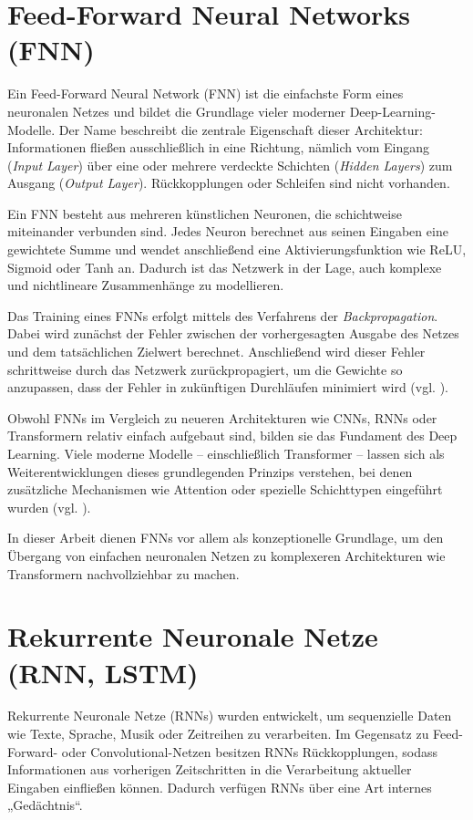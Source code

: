 \section{Feed-Forward Neural Networks (FNN)}

Ein Feed-Forward Neural Network (FNN) ist die einfachste Form eines neuronalen Netzes und bildet die Grundlage vieler moderner Deep-Learning-Modelle. Der Name beschreibt die zentrale Eigenschaft dieser Architektur: Informationen fließen ausschließlich in eine Richtung, nämlich vom Eingang (\textit{Input Layer}) über eine oder mehrere verdeckte Schichten (\textit{Hidden Layers}) zum Ausgang (\textit{Output Layer}). Rückkopplungen oder Schleifen sind nicht vorhanden.

Ein FNN besteht aus mehreren künstlichen Neuronen, die schichtweise miteinander verbunden sind. Jedes Neuron berechnet aus seinen Eingaben eine gewichtete Summe und wendet anschließend eine Aktivierungsfunktion wie ReLU, Sigmoid oder Tanh an. Dadurch ist das Netzwerk in der Lage, auch komplexe und nichtlineare Zusammenhänge zu modellieren.

Das Training eines FNNs erfolgt mittels des Verfahrens der \textit{Backpropagation}. Dabei wird zunächst der Fehler zwischen der vorhergesagten Ausgabe des Netzes und dem tatsächlichen Zielwert berechnet. Anschließend wird dieser Fehler schrittweise durch das Netzwerk zurückpropagiert, um die Gewichte so anzupassen, dass der Fehler in zukünftigen Durchläufen minimiert wird (vgl. \cite{Goodfellow-et-al-2016}).

Obwohl FNNs im Vergleich zu neueren Architekturen wie CNNs, RNNs oder Transformern relativ einfach aufgebaut sind, bilden sie das Fundament des Deep Learning. Viele moderne Modelle – einschließlich Transformer – lassen sich als Weiterentwicklungen dieses grundlegenden Prinzips verstehen, bei denen zusätzliche Mechanismen wie Attention oder spezielle Schichttypen eingeführt wurden (vgl. \cite{Goodfellow-et-al-2016}).

In dieser Arbeit dienen FNNs vor allem als konzeptionelle Grundlage, um den Übergang von einfachen neuronalen Netzen zu komplexeren Architekturen wie Transformern nachvollziehbar zu machen.

\section{Rekurrente Neuronale Netze (RNN, LSTM)}

Rekurrente Neuronale Netze (RNNs) wurden entwickelt, um sequenzielle Daten wie Texte, Sprache, Musik oder Zeitreihen zu verarbeiten. Im Gegensatz zu Feed-Forward- oder Convolutional-Netzen besitzen RNNs Rückkopplungen, sodass Informationen aus vorherigen Zeitschritten in die Verarbeitung aktueller Eingaben einfließen können. Dadurch verfügen RNNs über eine Art internes „Gedächtnis“.

